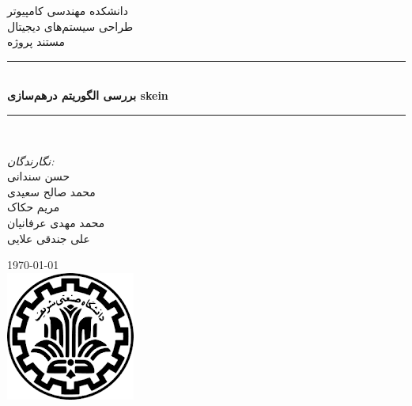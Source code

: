 \newcommand{\HRule}{\rule{\linewidth}{0.1mm}} 
\center %
 
    \textsc{\Large دانشکده مهندسی کامپیوتر}\\[0.5cm] %
    \textsc{\Large طراحی سیستم‌های دیجیتال}\\[0.5cm] %
    \textsc{\large مستند پروژه}\\[0.5cm] %

\HRule \\[0.4cm]
    { \huge \bfseries  بررسی الگوریتم درهم‌سازی skein}\\[0.1cm] %
\HRule \\[1.5cm]
 
\begin{minipage}{0.4\textwidth}
\begin{center}

 \large
    
    \emph{نگارندگان:}\\
    حسن سندانی\\
    محمد صالح سعیدی\\
    مریم حکاک\\
    محمد مهدی عرفانیان\\
    علی جندقی علایی
    \end{center}
\end{minipage}
\vspace{10mm}

{\large \today}\\[1cm] %
\includegraphics{figs/sharif.png}%
\vfill %